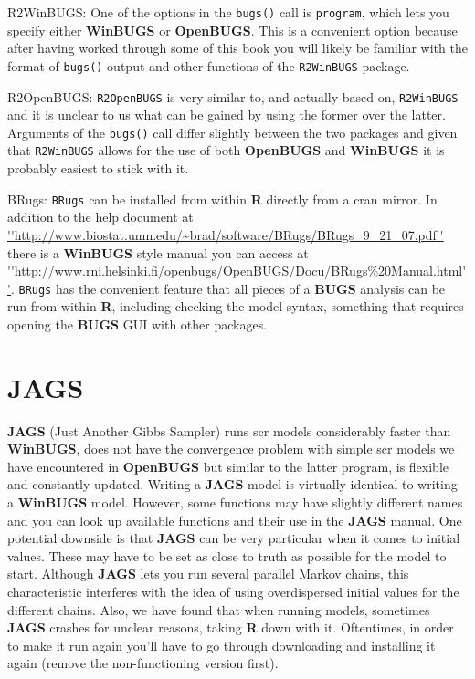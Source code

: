{\flushleft R2WinBUGS: }
One of the options in the {\tt bugs()} call is {\tt program}, which lets you specify either {\bf WinBUGS} or {\bf OpenBUGS}. This is a convenient option because after having worked through some of this book you will likely be familiar with the format of {\tt bugs()} output and other functions of the {\tt R2WinBUGS} package.

{\flushleft R2OpenBUGS: }
{\tt R2OpenBUGS} \citep{sturtz_etal:2005} is very similar to, and actually based on, {\tt R2WinBUGS} and it is unclear to us what can be gained by using the former over the latter. Arguments of the {\tt bugs()} call differ slightly between the two packages and given that {\tt R2WinBUGS} allows for the use of both {\bf OpenBUGS} and {\bf WinBUGS} it is probably easiest to stick with it. 

{\flushleft BRugs: }
{\tt BRugs} \citep{thomas_etal:2006} can be installed from within {\bf R} directly from a cran mirror. In addition to the help document at \url{''http://www.biostat.umn.edu/~brad/software/BRugs/BRugs_9_21_07.pdf''}  there is a {\bf WinBUGS} style manual you can access at \url{''http://www.rni.helsinki.fi/openbugs/OpenBUGS/Docu/BRugs%20Manual.html''}.
{\tt BRugs} has the convenient feature that all pieces of a {\bf BUGS} analysis can be run from within {\bf R}, including checking the model syntax, something that requires opening the {\bf BUGS} GUI with other packages. 



\section{JAGS}
{\bf JAGS} (Just Another Gibbs Sampler) \citep{plummer:2003} runs scr models considerably faster than {\bf WinBUGS}, does not have the convergence problem with simple scr models we have encountered in {\bf OpenBUGS} but similar to the latter program, is flexible and constantly updated. Writing a \mbox{\bf JAGS} model is virtually identical to writing a {\bf WinBUGS}
 model. However, some functions may have slightly different names and you 
 can look up available functions and their use in the {\bf JAGS} 
 manual. One potential downside is that {\bf JAGS} can be very particular 
 when it comes to initial values. These may have to be set as close to 
 truth as possible for the model to start. Although {\bf JAGS} lets 
 you run several parallel Markov chains, this characteristic interferes 
 with the idea of using overdispersed initial values for the different 
 chains. Also, we have found that when running models, sometimes {\bf JAGS} crashes for unclear reasons, taking {\bf R} down with it. Oftentimes, in order to make it run again you'll have to go through downloading and installing it again (remove the non-functioning version first).

